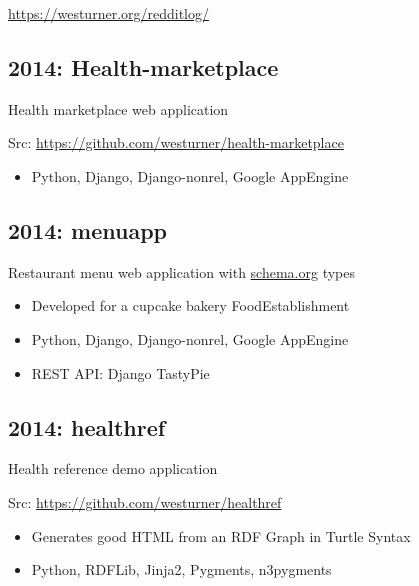 \documentclass[letter,,openany,oneside]{sphinxhowto}
\begin{document}
\begin{DUlineblock}{0em}
\item[] \url{https://westurner.org/redditlog/}
\end{DUlineblock}


\subsection{2014: Health-marketplace}
\label{resume:health-marketplace}
\begin{DUlineblock}{0em}
\item[] Health marketplace web application
\item[] Src: \url{https://github.com/westurner/health-marketplace}
\end{DUlineblock}
\begin{itemize}
\item {} 
Python, Django, Django-nonrel, Google AppEngine

\end{itemize}


\subsection{2014: menuapp}
\label{resume:menuapp}
\begin{DUlineblock}{0em}
\item[] Restaurant menu web application with \href{http://schema.org/docs/full.html}{schema.org} types
\end{DUlineblock}
\begin{itemize}
\item {} 
Developed for a cupcake bakery FoodEstablishment

\item {} 
Python, Django, Django-nonrel, Google AppEngine

\item {} 
REST API: Django TastyPie

\end{itemize}


\subsection{2014: healthref}
\label{resume:healthref}
\begin{DUlineblock}{0em}
\item[] Health reference demo application
\item[] Src: \url{https://github.com/westurner/healthref}
\end{DUlineblock}
\begin{itemize}
\item {} 
Generates good HTML from an RDF Graph in Turtle Syntax

\item {} 
Python, RDFLib, Jinja2, Pygments, n3pygments

\end{itemize}
\end{document}
